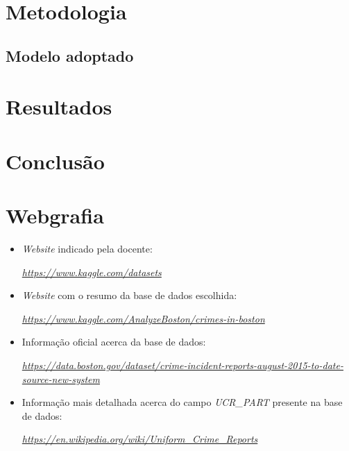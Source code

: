 \documentclass[a4paper]{report}
\begin{document}
\chapter{Metodologia}
    \section{Modelo adoptado}

\chapter{Resultados}

\chapter{Conclusão}

\chapter{Webgrafia}
	\begin{itemize}
		\item \textit{Website} indicado pela docente:
		\par \textit{\url{https://www.kaggle.com/datasets}}
        \item \textit{Website} com o resumo da base de dados escolhida:
        \par \textit{\url{https://www.kaggle.com/AnalyzeBoston/crimes-in-boston}}
        \item Informação oficial acerca da base de dados:
		\par \textit{\url{https://data.boston.gov/dataset/crime-incident-reports-august-2015-to-date-source-new-system}}
		\item Informação mais detalhada acerca do campo \textit{UCR\_PART} presente na base de dados:
		\par \textit{\url{https://en.wikipedia.org/wiki/Uniform\_Crime\_Reports}}
    \end{itemize}
\end{document}

